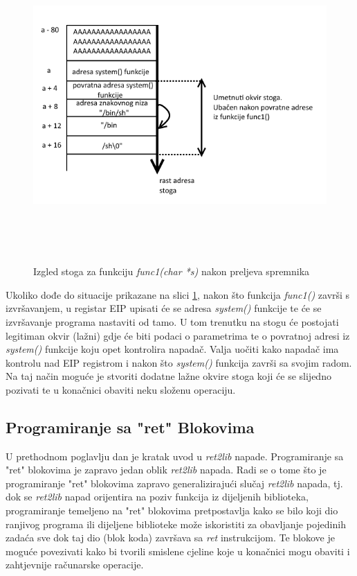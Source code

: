 \documentclass[times, utf8, diplomski, numeric]{fer}
\begin{document}
\begin{figure}[!htb]
\centering
\setlength\fboxsep{0pt}
\setlength\fboxrule{0.5pt}
\includegraphics[width=13cm, height=12cm]{slike/ret2lib}
\caption{Izgled stoga za funkciju \emph{func1(char *s)} nakon preljeva spremnika}
\label{fig:ret2lib} 
\end{figure}

Ukoliko dođe do situacije prikazane na slici \ref{fig:ret2lib},
nakon što funkcija \emph{func1()} završi s izvršavanjem, u
registar EIP upisati će se adresa \emph{system()} funkcije te će
se izvršavanje programa nastaviti od tamo. U tom trenutku na
stogu će postojati legitiman okvir (lažni) gdje će biti podaci o
parametrima te o povratnoj adresi iz \emph{system()} funkcije
koju opet kontrolira napadač. Valja uočiti kako napadač ima
kontrolu nad EIP registrom i nakon što \emph{system()} funkcija
završi sa svojim radom. Na taj način moguće je stvoriti dodatne
lažne okvire stoga koji će se slijedno pozivati te u konačnici
obaviti neku složenu operaciju. 

\subsection{Programiranje sa "ret" Blokovima}
\label{sct:rop2}

U prethodnom poglavlju dan je kratak uvod u \emph{ret2lib}
napade. Programiranje sa "ret" blokovima je zapravo jedan oblik
\emph{ret2lib} napada. Radi se o tome što je programiranje "ret"
blokovima zapravo generalizirajući slučaj \emph{ret2lib} napada,
tj. dok se \emph{ret2lib} napad orijentira na poziv funkcija iz
dijeljenih biblioteka, programiranje temeljeno na "ret" blokovima
pretpostavlja kako se bilo koji dio ranjivog programa ili
dijeljene biblioteke može iskoristiti za obavljanje pojedinih
zadaća sve dok taj dio (blok koda) završava sa \emph{ret}
instrukcijom. Te blokove je moguće povezivati kako bi tvorili
smislene cjeline koje u konačnici mogu obaviti i zahtjevnije
računarske operacije.
\end{document}
